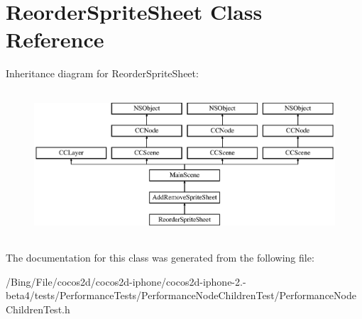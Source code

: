 \hypertarget{interface_reorder_sprite_sheet}{\section{Reorder\-Sprite\-Sheet Class Reference}
\label{interface_reorder_sprite_sheet}
}
Inheritance diagram for Reorder\-Sprite\-Sheet\-:\begin{figure}[H]
\begin{center}
\leavevmode
\includegraphics[height=5.490196cm]{interface_reorder_sprite_sheet}
\end{center}
\end{figure}


The documentation for this class was generated from the following file\-:\begin{DoxyCompactItemize}
\item 
/\-Bing/\-File/cocos2d/cocos2d-\/iphone/cocos2d-\/iphone-\/2.-\/beta4/tests/\-Performance\-Tests/\-Performance\-Node\-Children\-Test/Performance\-Node\-Children\-Test.\-h\end{DoxyCompactItemize}
